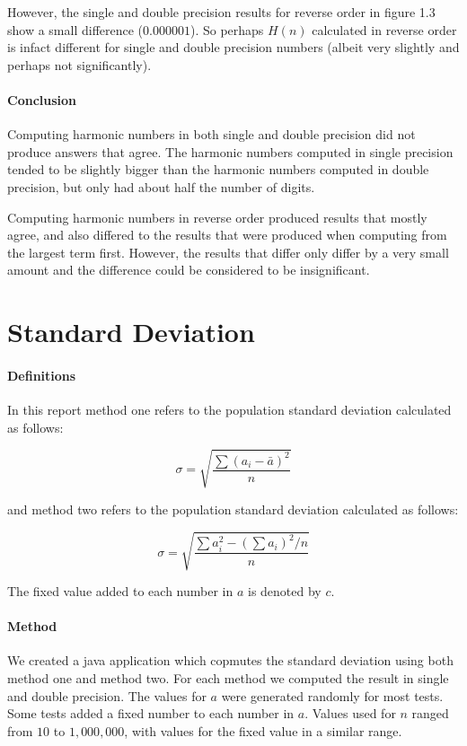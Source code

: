 \documentclass[12pt]{article}
\begin{document}
However, the single and double precision results for reverse order in figure 1.3 show a small difference ($0.000001$). So perhaps $H(n)$ calculated in reverse order is infact different for single and double precision numbers (albeit very slightly and perhaps not significantly).	

\paragraph{Conclusion}
Computing harmonic numbers in both single and double precision did not produce answers that agree. The harmonic numbers computed in single precision tended to be slightly bigger than the harmonic numbers computed in double precision, but only had about half the number of digits. 

Computing harmonic numbers in reverse order produced results that mostly agree, and also differed to the results that were produced when computing from the largest term first. However, the results that differ only differ by a very small amount and the difference could be considered to be insignificant.


\section{Standard Deviation}
\paragraph{Definitions} In this report method one refers to the population standard deviation calculated as follows:

{\large $$\sigma=\sqrt{\frac{\sum(a_{i}-\bar{a})^2}{n}}$$}

and method two refers to the population standard deviation calculated as follows:

{\large $$\sigma=\sqrt{\frac{\sum a^{2}_{i}-(\sum a_{i})^2/n}{n}}$$}

The fixed value added to each number in $a$ is denoted by $c$.

\paragraph{Method} We created a java application which copmutes the standard deviation using both method one and method two. For each method we computed the result in single and double precision. The values for $a$ were generated randomly for most tests. Some tests added a fixed number to each number in $a$. Values used for $n$ ranged from $10$ to $1,000,000$, with values for the fixed value in a similar range.
\end{document}
